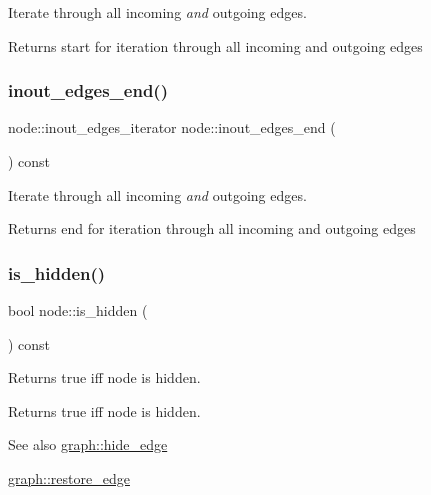 Iterate through all incoming {\itshape and} outgoing edges.

\begin{DoxyReturn}{Returns}
start for iteration through all incoming and outgoing edges 
\end{DoxyReturn}
\mbox{\label{classnode_ad4eec3efcc3c1e572b0492276e20980c}} 
\subsubsection{\texorpdfstring{inout\+\_\+edges\+\_\+end()}{inout\_edges\_end()}}
{\footnotesize\ttfamily node\+::inout\+\_\+edges\+\_\+iterator node\+::inout\+\_\+edges\+\_\+end (\begin{DoxyParamCaption}{ }\end{DoxyParamCaption}) const}

Iterate through all incoming {\itshape and} outgoing edges.

\begin{DoxyReturn}{Returns}
end for iteration through all incoming and outgoing edges 
\end{DoxyReturn}
\mbox{\label{classnode_af948e15fd00a31e67928c9061acda582}} 
\subsubsection{\texorpdfstring{is\+\_\+hidden()}{is\_hidden()}}
{\footnotesize\ttfamily bool node\+::is\+\_\+hidden (\begin{DoxyParamCaption}{ }\end{DoxyParamCaption}) const}

Returns true iff node is hidden.

\begin{DoxyReturn}{Returns}
true iff node is hidden. 
\end{DoxyReturn}
\begin{DoxySeeAlso}{See also}
\mbox{\hyperlink{classgraph_ab2f8520bcac080d73c55228fecc61825}{graph\+::hide\+\_\+edge}} 

\mbox{\hyperlink{classgraph_a2e5426682a0897b9f9104b019970bedc}{graph\+::restore\+\_\+edge}} 
\end{DoxySeeAlso}
\mbox{\label{classnode_a13dbd1809a33a5efede64a359e53a363}} 
